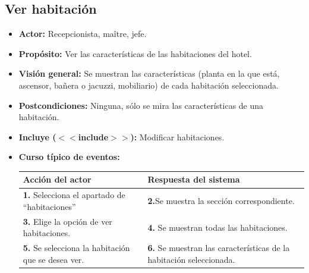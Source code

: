 \documentclass[spanish,a4paper,11pt, twoside]{report}	%
\begin{document}
	
	\hspace{-1.7 true cm}
	\subsection{Ver habitación}
		\begin{itemize}
			\item \textbf{Actor:} Recepcionista, maître, jefe.
			\item \textbf{Propósito: } Ver las características de las habitaciones del hotel.
			\item \textbf{Visión general:} Se muestran las características (planta en la que
					está, ascensor, bañera o jacuzzi, mobiliario) de cada habitación seleccionada.
			\item \textbf{Postcondiciones:} Ninguna, sólo se mira las características de una habitación.
			\item \textbf{Incluye ($<<$include$>>$):} Modificar habitaciones.
			\item \textbf{Curso típico de eventos:} 	\\
				\begin{tabular}{|p{6cm}||p{6cm}|}
				\hline
				\textbf{Acción del actor} & \textbf{Respuesta del sistema} \\ \hline
				\textbf{1.} Selecciona el apartado de ``habitaciones'' & 
				\textbf{2.}Se muestra la sección correspondiente.\\ \hline 
				\textbf{3.} Elige la opción de ver habitaciones. & 
				\textbf{4.} Se muestran todas las habitaciones.  \\ \hline
				\textbf{5.} Se selecciona la habitación que se desea ver. & 
				\textbf{6.} Se muestran las características de la habitación seleccionada. \\ \hline
			\end{tabular}
			\\
		\end {itemize}
		
\end{document}
